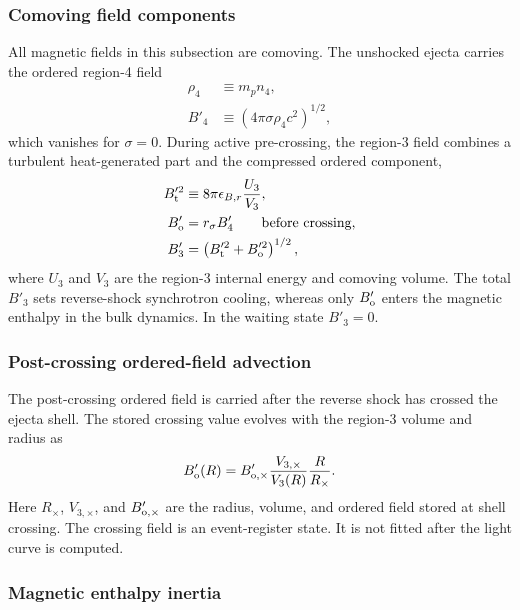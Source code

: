 \documentclass[twocolumn]{aastex702}
\begin{document}
\subsubsection{Comoving field components}

All magnetic fields in this subsection are comoving.  The unshocked ejecta carries
the ordered region-4 field
\begin{equation}
\begin{aligned}
\rho_4&\equiv m_pn_4,\\
B'_4&\equiv (4\pi\sigma\rho_4c^2)^{1/2},
\end{aligned}
\end{equation}
which vanishes for \(\sigma=0\).  During active pre-crossing, the region-3 field
combines a turbulent heat-generated part and the compressed ordered component,
\begin{equation}
\begin{aligned}
B_{\rm t}^{\prime 2}&\equiv 8\pi\epsilon_{B,r}\frac{U_3}{V_3},\\
B'_{\rm o}&=r_\sigma B'_4 \qquad \hbox{before crossing},\\
B'_3&=\left(B_{\rm t}^{\prime 2}+B_{\rm o}^{\prime 2}\right)^{1/2},
\end{aligned}
\end{equation}
where \(U_3\) and \(V_3\) are the region-3 internal energy and comoving volume.
The total \(B'_3\) sets reverse-shock synchrotron cooling, whereas only
\(B'_{\rm o}\) enters the magnetic enthalpy in the bulk dynamics.  In the waiting
state \(B'_3=0\).

\subsubsection{Post-crossing ordered-field advection}

The post-crossing ordered field is carried after the reverse shock has crossed
the ejecta shell.  The stored crossing value evolves with the region-3 volume and
radius as
\begin{equation}
B'_{\rm o}(R)=B'_{{\rm o},\times}
\frac{V_{3,\times}}{V_3(R)}
\frac{R}{R_\times}.
\end{equation}
Here \(R_\times\), \(V_{3,\times}\), and \(B'_{{\rm o},\times}\) are the radius,
volume, and ordered field stored at shell crossing.  The crossing field is an
event-register state.  It is not fitted after the light curve is computed.

\subsubsection{Magnetic enthalpy inertia}
\end{document}
